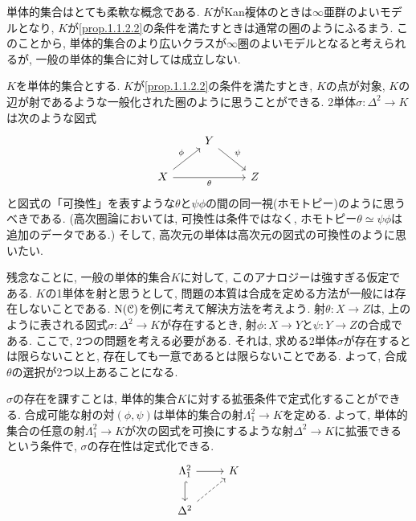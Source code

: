 \documentclass[uplatex, a4paper, 14Q, dvipdfmx]{jsreport}
\begin{document}
単体的集合はとても柔軟な概念である. 
$K$がKan複体のときは$\infty$亜群のよいモデルとなり, $K$が\cref{prop.1.1.2.2}の条件を満たすときは通常の圏のようにふるまう.
このことから, 単体的集合のより広いクラスが$\infty$圏のよいモデルとなると考えられるが, 一般の単体的集合に対しては成立しない.

$K$を単体的集合とする.
$K$が\cref{prop.1.1.2.2}の条件を満たすとき, $K$の点が対象, $K$の辺が射であるような一般化された圏のように思うことができる. 
2単体$\sigma : \Delta^2 \to K$は次のような図式
\[\begin{tikzcd}
	& Y \\
	X && Z
	\arrow["\psi", from=1-2, to=2-3]
	\arrow["\phi", from=2-1, to=1-2]
	\arrow["\theta"', from=2-1, to=2-3]
\end{tikzcd}\]
と図式の「可換性」を表すような$\theta$と$\psi\phi$の間の同一視(ホモトピー)のように思うべきである.
(高次圏論においては, 可換性は条件ではなく, ホモトピー$\theta \simeq \psi\phi$は追加のデータである.)
そして, 高次元の単体は高次元の図式の可換性のように思いたい. 

残念なことに, 一般の単体的集合$K$に対して, このアナロジーは強すぎる仮定である.
$K$の1単体を射と思うとして, 問題の本質は合成を定める方法が一般には存在しないことである. 
$\mathrm{N}(\mathcal{C})$を例に考えて解決方法を考えよう. 
射$\theta : X \to Z$は, 上のように表される図式$\sigma : \Delta^2 \to K$が存在するとき, 射$\phi : X \to Y$と$\psi : Y \to Z$の合成である. 
ここで, 2つの問題を考える必要がある. 
それは, 求める2単体$\sigma$が存在するとは限らないことと, 存在しても一意であるとは限らないことである. 
よって, 合成$\theta$の選択が2つ以上あることになる. 

$\sigma$の存在を課すことは, 単体的集合$K$に対する拡張条件で定式化することができる.
合成可能な射の対$(\phi,\psi)$は単体的集合の射$\Lambda^2_1 \to K$を定める.
よって, 単体的集合の任意の射$\Lambda^2_1 \to K$が次の図式を可換にするような射$\Delta^2 \to K$に拡張できるという条件で, $\sigma$の存在性は定式化できる. 
\[\begin{tikzcd}
	{\Lambda^2_1} & K \\
	{\Delta^2}
	\arrow[from=1-1, to=1-2]
	\arrow[hook, from=1-1, to=2-1]
	\arrow[dashed, from=2-1, to=1-2]
\end{tikzcd}\]
\end{document}
